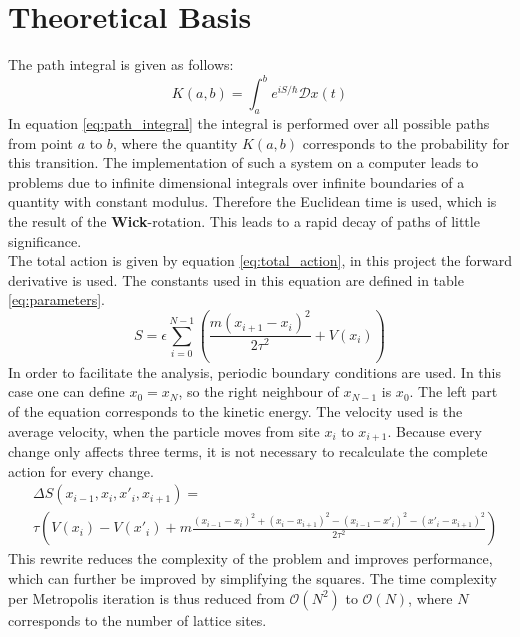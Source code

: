 \documentclass{scrartcl}
\begin{document}
	\section{Theoretical Basis}
		The path integral is given as follows:
		\begin{equation}
			K(a, b) = \int_a^b e^{iS/\hbar} \mathcal Dx(t)
			\label{eq:path_integral}
		\end{equation}
		In equation \ref{eq:path_integral} the integral is performed over all possible paths from point $a$ to $b$, where the quantity $K(a, b)$ corresponds to the probability for this transition.
		The implementation of such a system on a computer leads to problems due to infinite dimensional integrals over infinite boundaries of a quantity with constant modulus.
		Therefore the Euclidean time is used, which is the result of the \textbf{Wick}-rotation.
		This leads to a rapid decay of paths of little significance.
		\\
		The total action is given by equation \ref{eq:total_action}, in this project the forward derivative is used.
		The constants used in this equation are defined in table \ref{eq:parameters}.
		\begin{equation}
			S = \epsilon \sum_{i=0}^{N - 1} \left(\frac{m(x_{i+1} - x_i)^2}{2\tau^2} + V(x_i)\right)
			\label{eq:total_action}
		\end{equation}
		In order to facilitate the analysis, periodic boundary conditions are used.
		In this case one can define $x_0 = x_N$, so the right neighbour of $x_{N-1}$ is $x_0$.
		The left part of the equation corresponds to the kinetic energy.
		The velocity used is the average velocity, when the particle moves from site $x_i$ to $x_{i+1}$.
		Because every change only affects three terms, it is not necessary to recalculate the complete action for every change.
		\begin{align}
			&\Delta S(x_{i-1}, x_i, x'_i, x_{i+1}) =\nonumber\\
			&\tau\left(V(x_i) - V(x'_i) + m\frac{(x_{i-1} - x_i)^2 + (x_i - x_{i+1})^2 - (x_{i-1} - x'_i)^2 - (x'_i - x_{i+1})^2}{2\tau^2}\right)
			\label{eq:delta_total_action}
		\end{align}
		This rewrite reduces the complexity of the problem and improves performance, which can further be improved by simplifying the squares.
		The time complexity per Metropolis iteration is thus reduced from $\mathcal O(N^2)$ to $\mathcal O(N)$, where $N$ corresponds to the number of lattice sites.
\end{document}

